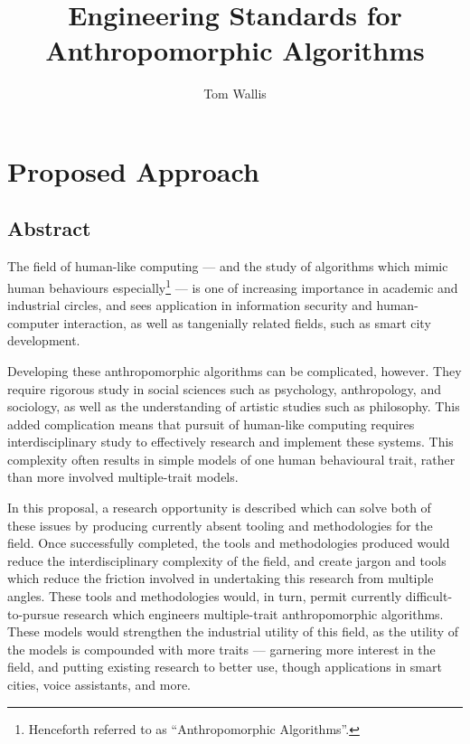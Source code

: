 

\title{Engineering Standards for Anthropomorphic Algorithms}
\author{Tom Wallis}
\date{}
\maketitle


\section{Proposed Approach}
\label{sec:proposed_approach}
\subsection{Abstract}\label{sec:abstract}
The field of human-like computing --- and the study of algorithms which mimic human behaviours especially\footnote{Henceforth referred to as ``Anthropomorphic Algorithms''.} --- is one of increasing importance in academic and industrial circles, and sees application in information security and human-computer interaction, as well as tangenially related fields, such as smart city development.\par

Developing these anthropomorphic algorithms can be complicated, however. They require rigorous study in social sciences such as psychology, anthropology, and sociology, as well as the understanding of artistic studies such as philosophy. This added complication means that pursuit of human-like computing requires interdisciplinary study to effectively research and implement these systems. This complexity often results in simple models of one human behavioural trait, rather than more involved multiple-trait models.\par

% 
In this proposal, a research opportunity is described which can solve both of these issues by producing currently absent tooling and methodologies for the field. Once successfully completed, the tools and methodologies produced would reduce the interdisciplinary complexity of the field, and create jargon and tools which reduce the friction involved in undertaking this research from multiple angles. These tools and methodologies would, in turn, permit currently difficult-to-pursue research which engineers multiple-trait anthropomorphic algorithms. These models would strengthen the industrial utility of this field, as the utility of the models is compounded with more traits --- garnering more interest in the field, and putting existing research to better use, though applications in smart cities, voice assistants, and more.\par


